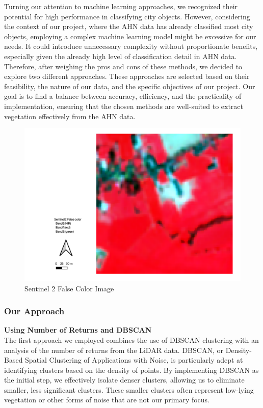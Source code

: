 \documentclass{article}
\begin{document}
\noindent Turning our attention to machine learning approaches, we recognized their potential for high performance in classifying city objects. However, considering the context of our project, where the AHN data has already classified most city objects, employing a complex machine learning model might be excessive for our needs. It could introduce unnecessary complexity without proportionate benefits, especially given the already high level of classification detail in AHN data.\\

\noindent Therefore, after weighing the pros and cons of these methods, we decided to explore two different approaches. These approaches are selected based on their feasibility, the nature of our data, and the specific objectives of our project. Our goal is to find a balance between accuracy, efficiency, and the practicality of implementation, ensuring that the chosen methods are well-suited to extract vegetation effectively from the AHN data.\\

\begin{figure}[H]
    \centering
    \includegraphics[width=0.7\linewidth]{Figures/nir.png}
    \caption{Sentinel 2 False Color Image}
    \label{nir}
\end{figure}

\subsubsection{Our Approach}
\noindent \textbf{Using Number of Returns and DBSCAN}\\
\noindent The first approach we employed combines the use of DBSCAN clustering with an analysis of the number of returns from the LiDAR data. DBSCAN, or Density-Based Spatial Clustering of Applications with Noise, is particularly adept at identifying clusters based on the density of points. By implementing DBSCAN as the initial step, we effectively isolate denser clusters, allowing us to eliminate smaller, less significant clusters. These smaller clusters often represent low-lying vegetation or other forms of noise that are not our primary focus.\\
\end{document}
